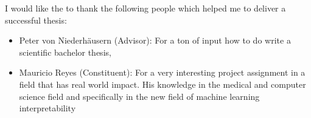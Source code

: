 I would like the to thank the following people which helped me to deliver a successful thesis:
\begin{itemize}
    \item Peter von Niederhäusern (Advisor): For a ton of input how to do write a scientific bachelor thesis, 
    \item Mauricio Reyes (Constituent): For a very interesting project assignment in a field that has real world impact. His knowledge in the medical and computer science field and specifically in the new field of machine learning interpretability
\end{itemize}